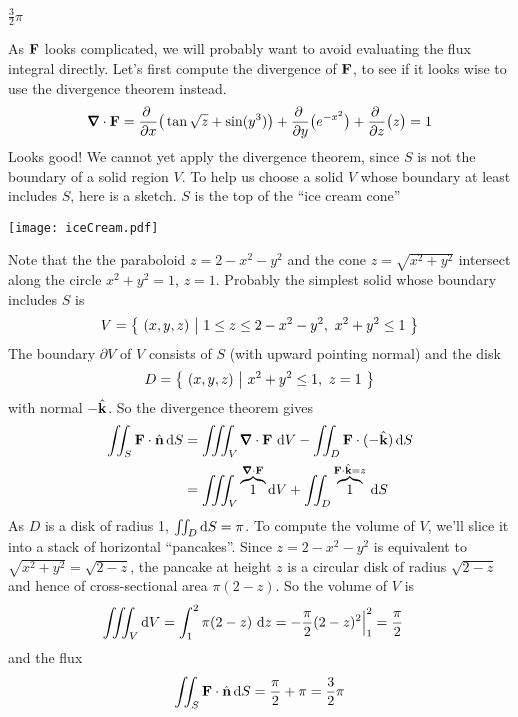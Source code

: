 \begin{answer} 
$\frac{3}{2}\pi$
\end{answer}

\begin{solution} 
As $\mathbf{F}$ looks complicated, we will probably want to avoid evaluating
the flux integral directly. Let's first compute the divergence of $\mathbf{F}$,
to see if it looks wise to use the divergence theorem instead.
\begin{align*}
\vnabla\cdot\vF = 
   \pdiff{}{x}\big(\tan \sqrt{z} + \sin(y^3)\big)
   +\pdiff{}{y}\big(e^{-x^2}\big)
   +\pdiff{}{z}\big(z\big)
=1
\end{align*}
Looks good! We cannot yet apply the divergence theorem, since $S$ is
not the boundary of a solid region $V$. To help us choose a solid 
$V$ whose boundary at least includes $S$, here is a sketch. $S$ is the
top of the ``ice cream cone''

\begin{center}
       \texttt{[image: iceCream.pdf]}
\end{center}
Note that the the paraboloid $z = 2 - x^2 - y^2$ and the cone
$z = \sqrt{x^2+y^2}$ intersect along the circle $x^2+y^2=1$, $z=1$.
Probably the simplest solid whose boundary includes $S$ is
\begin{equation*}
V=\Set{(x,y,z)}{1\le z\le 2-x^2-y^2,\ x^2+y^2\le 1}
\end{equation*}
The boundary $\partial V$ of $V$ consists of $S$ (with upward pointing normal)
and the disk
\begin{equation*}
D = \big\{ \ (x,y,z)\ \big|\ x^2+y^2\le 1,\ z=1\ \big\}
\end{equation*}
with normal $-\hat{\mathbf{k}}$. So the divergence theorem gives
\begin{align*}
\dblInt_S \vF \cdot\hn\,\dee{S}
&=\tripInt_V \vnabla\cdot\vF\ \dee{V} 
      -\dblInt_D \vF \cdot(-\hk)\,\dee{S} \\
&=\tripInt_V  \overbrace{1}^{\vnabla\cdot\vF}\dee{V} 
      +\dblInt_D \overbrace{1}^{\vF \cdot \hk = z}\,\dee{S} 
\end{align*}
As $D$ is a disk of radius 1, $\iint_D \mathrm{d}S=\pi$. To compute the volume of
$V$, we'll slice it into a stack of horizontal ``pancakes''. Since
$z=2-x^2-y^2$ is equivalent to $\sqrt{x^2+y^2}=\sqrt{2-z}$, the pancake at height $z$
is a circular disk of radius $\sqrt{2-z}$ and hence of cross-sectional area
$\pi(2-z)$. So the volume of $V$ is
\begin{align*}
\iiint_V  \mathrm{d}V
&=\int_1^2 \pi(2-z) \ \mathrm{d}z
= -\frac{\pi}{2}(2-z)^2\Big|_1^2
=\frac{\pi}{2}
\end{align*}
and the flux
\begin{align*}
\iint_S \mathbf{F} \cdot\hat{\mathbf{n}}\,\mathrm{d}S
=\frac{\pi}{2} +\pi =\frac{3}{2}\pi
\end{align*}

\end{solution}

